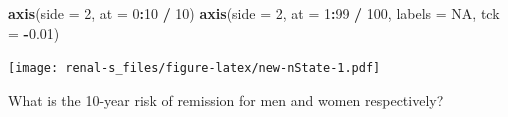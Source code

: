\documentclass[
]{book}
\newenvironment{Shaded}{\begin{snugshade}}{\end{snugshade}}
\newcommand{\AttributeTok}[1]{\textcolor[rgb]{0.13,0.29,0.53}{#1}}
\newcommand{\ConstantTok}[1]{\textcolor[rgb]{0.56,0.35,0.01}{#1}}
\newcommand{\DecValTok}[1]{\textcolor[rgb]{0.00,0.00,0.81}{#1}}
\newcommand{\FloatTok}[1]{\textcolor[rgb]{0.00,0.00,0.81}{#1}}
\newcommand{\FunctionTok}[1]{\textcolor[rgb]{0.13,0.29,0.53}{\textbf{#1}}}
\newcommand{\NormalTok}[1]{#1}
\newcommand{\SpecialCharTok}[1]{\textcolor[rgb]{0.81,0.36,0.00}{\textbf{#1}}}
\begin{document}
\begin{enumerate}
\begin{Shaded}
\begin{Highlighting}[]
\FunctionTok{axis}\NormalTok{(}\AttributeTok{side =} \DecValTok{2}\NormalTok{, }\AttributeTok{at =} \DecValTok{0}\SpecialCharTok{:}\DecValTok{10} \SpecialCharTok{/} \DecValTok{10}\NormalTok{)}
\FunctionTok{axis}\NormalTok{(}\AttributeTok{side =} \DecValTok{2}\NormalTok{, }\AttributeTok{at =} \DecValTok{1}\SpecialCharTok{:}\DecValTok{99} \SpecialCharTok{/} \DecValTok{100}\NormalTok{, }\AttributeTok{labels =} \ConstantTok{NA}\NormalTok{, }\AttributeTok{tck =} \SpecialCharTok{{-}}\FloatTok{0.01}\NormalTok{)}
\end{Highlighting}
\end{Shaded}

  \texttt{[image: renal-s\_files/figure-latex/new-nState-1.pdf]}

  What is the 10-year risk of remission for men and women respectively?
\end{enumerate}

  
\end{document}
